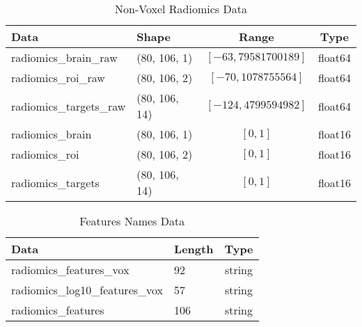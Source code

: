 \begin{table}[H]
\centering
\begin{tabular}{|l|l|c|c|}
\hline
\textbf{Data} & \textbf{Shape} & \textbf{Range} & \textbf{Type} \\ \hline
radiomics\_brain\_raw & (80, 106, 1) & $[-63,79581700189]$ & float64 \\ \hline
radiomics\_roi\_raw & (80, 106, 2) & $[-70,1078755564]$ & float64 \\ \hline
radiomics\_targets\_raw & (80, 106, 14) & $[-124,4799594982]$ & float64 \\ \hline
radiomics\_brain & (80, 106, 1) & $[0,1]$ & float16 \\ \hline
radiomics\_roi & (80, 106, 2) & $[0,1]$ & float16 \\ \hline
radiomics\_targets & (80, 106, 14) & $[0,1]$ & float16 \\ \hline
\end{tabular}
\caption{Non-Voxel Radiomics Data}
\label{tab:datasrad}
\end{table}

\begin{table}[H]
\centering
\begin{tabular}{|l|l|c|}
\hline
\textbf{Data} & \textbf{Length} & \textbf{Type} \\ \hline
radiomics\_features\_vox & 92 & string \\ \hline
radiomics\_log10\_features\_vox & 57 & string \\ \hline
radiomics\_features & 106 & string \\ \hline
\end{tabular}
\caption{Features Names Data}
\label{tab:datasfea}
\end{table}






